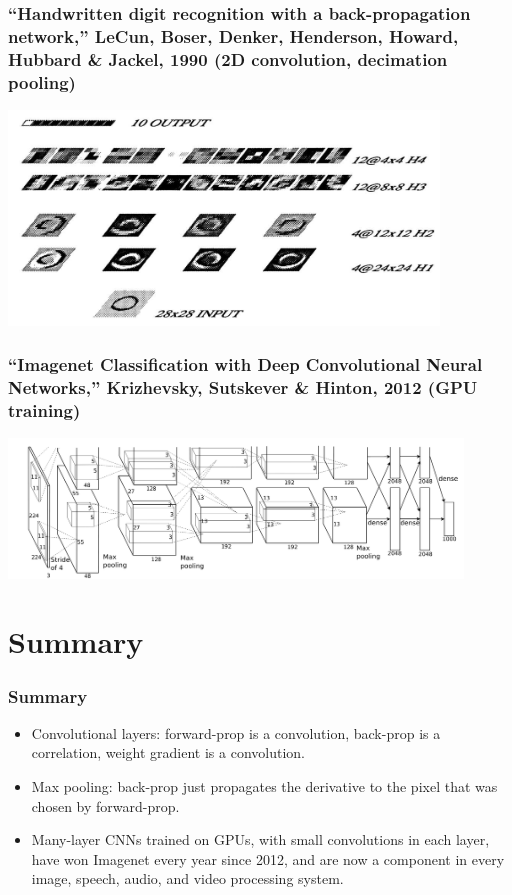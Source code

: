 \documentclass{beamer}
\begin{document}
\begin{frame}
  \frametitle{``Handwritten digit recognition with a back-propagation
    network,'' LeCun, Boser, Denker, Henderson, Howard, Hubbard \&
    Jackel, 1990 (2D convolution, decimation pooling)}
  \centerline{\includegraphics[width=4.5in]{figs/lecun1990.png}}
\end{frame}

\begin{frame}
  \frametitle{``Imagenet Classification with Deep Convolutional Neural
    Networks,'' Krizhevsky, Sutskever \& Hinton, 2012 (GPU training)}
  \centerline{\includegraphics[width=4.75in]{figs/krizhevsky2012.png}}
\end{frame}


\section{Summary}
\setcounter{subsection}{1}

\begin{frame}
  \frametitle{Summary}
  \begin{itemize}
  \item Convolutional layers: forward-prop is a convolution, back-prop
    is a correlation, weight gradient is a convolution.
  \item Max pooling: back-prop just propagates the derivative to the
    pixel that was chosen by forward-prop.
  \item Many-layer CNNs trained on GPUs, with small convolutions in
    each layer, have won Imagenet every year since 2012, and are now a
    component in every image, speech, audio, and video processing
    system.
  \end{itemize}
\end{frame}
\end{document}
